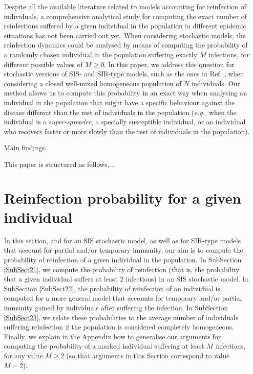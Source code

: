 \documentclass[preprint,12pt]{elsarticle}
\begin{document}
\par Despite all the available literature related to models accounting for reinfection of individuals, a comprehensive analytical study for computing the exact number of reinfections suffered by a given individual in the population in different epidemic situations has not been carried out yet. When considering stochastic models, the reinfection dynamics could be analysed by means of computing the probability of a randomly chosen individual in the population suffering exactly $M$ infections, for different possible values of $M\geq0$. In this paper, we address this question for stochastic versions of SIS- and SIR-type models, such as the ones in Ref. \cite{gomes2004infection}, when considering a closed well-mixed homogeneous population of $N$ individuals. Our method allows us to compute this probability in an exact way when analysing an individual in the population that might have a specific behaviour against the disease different than the rest of individuals in the population ({\it e.g.,} when the individual is a {\it super-spreader}, a specially susceptible individual, or an individual who recovers faster or more slowly than the rest of individuals in the population).

\par Main findings.

\par This paper is structured as follows,...

\section{Reinfection probability for a given individual}
\label{Sect2}

\par In this section, and for an SIS stochastic model, as well as for SIR-type models that account for partial and/or temporary immunity, our aim is to compute the probability of reinfection of a given individual in the population. In SubSection \ref{SubSect21}, we compute the probability of reinfection (that is, the probability that a given individual suffers
at least $2$ infections) in an SIS stochastic model. In SubSection \ref{SubSect22}, the probability of reinfection of an individual
is computed for a more general model that accounts for temporary and/or partial immunity gained by individuals after suffering the infection. In
SubSection \ref{SubSect23}, we relate these probabilities to the average number of individuals suffering reinfection if the population is
considered completely homogeneous. Finally, we explain in the Appendix how to generalise our arguments for computing the probability of a marked individual
suffering at least $M$ infections, for any value $M\geq2$ (so that arguments in this Section correspond to value $M=2$).
\end{document}

